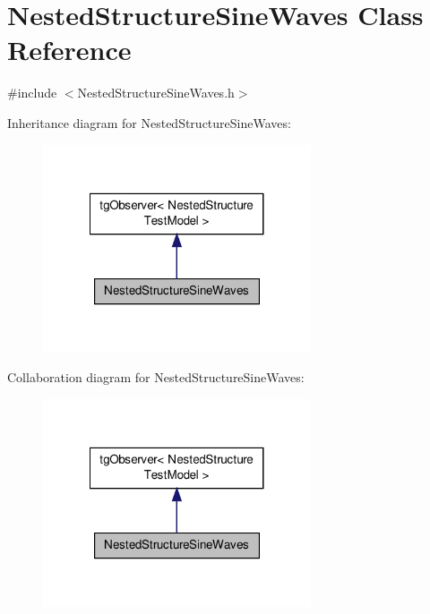 \hypertarget{class_nested_structure_sine_waves}{\section{Nested\-Structure\-Sine\-Waves Class Reference}
\label{class_nested_structure_sine_waves}
}


{\ttfamily \#include $<$Nested\-Structure\-Sine\-Waves.\-h$>$}



Inheritance diagram for Nested\-Structure\-Sine\-Waves\-:\nopagebreak
\begin{figure}[H]
\begin{center}
\leavevmode
\includegraphics[width=224pt]{class_nested_structure_sine_waves__inherit__graph}
\end{center}
\end{figure}


Collaboration diagram for Nested\-Structure\-Sine\-Waves\-:\nopagebreak
\begin{figure}[H]
\begin{center}
\leavevmode
\includegraphics[width=224pt]{class_nested_structure_sine_waves__coll__graph}
\end{center}
\end{figure}

